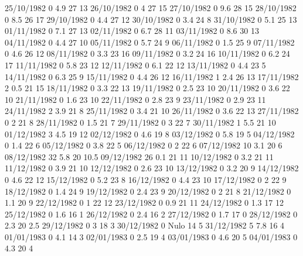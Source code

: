 25/10/1982  0      4.9    27     13 
26/10/1982  0      4      27     15 
27/10/1982  0      9.6    28     15 
28/10/1982  0      8.5    26     17 
29/10/1982  0      4.4    27     12 
30/10/1982  0      3.4    24     8 
31/10/1982  0      5.1    25     13 
01/11/1982  0      7.1    27     13 
02/11/1982  0      6.7    28     11 
03/11/1982  0      8.6    30     13 
04/11/1982  0      4.4    27     10 
05/11/1982  0      5.7    24     9 
06/11/1982  0      1.5    25     9 
07/11/1982  0      4.6    26     12 
08/11/1982  0      3.3    23     16 
09/11/1982  0      3.2    24     16 
10/11/1982  0      6.2    24     17 
11/11/1982  0      5.8    23     12 
12/11/1982  0      6.1    22     12 
13/11/1982  0      4.4    23     5 
14/11/1982  0      6.3    25     9 
15/11/1982  0      4.4    26     12 
16/11/1982  1      2.4    26     13 
17/11/1982  2      0.5    21     15 
18/11/1982  0      3.3    22     13 
19/11/1982  0      2.5    23     10 
20/11/1982  0      3.6    22     10 
21/11/1982  0      1.6    23     10 
22/11/1982  0      2.8    23     9 
23/11/1982  0      2.9    23     11 
24/11/1982  2      3.9    21     8 
25/11/1982  0      3.4    21     10 
26/11/1982  0      3.6    22     13 
27/11/1982  0      2      21     8 
28/11/1982  0      1.5    21     7 
29/11/1982  0      3      22     7 
30/11/1982  1      5.5    21     10 
01/12/1982  3      4.5    19     12 
02/12/1982  0      4.6    19     8 
03/12/1982  0      5.8    19     5 
04/12/1982  0      1.4    22     6 
05/12/1982  0      3.8    22     5 
06/12/1982  0      2      22     6 
07/12/1982  10     3.1    20     6 
08/12/1982  32     5.8    20     10.5 
09/12/1982  26     0.1    21     11 
10/12/1982  0      3.2    21     11 
11/12/1982  0      3.9    21     10 
12/12/1982  0      2.6    23     10 
13/12/1982  0      3.2    20     9 
14/12/1982  0      4.6    22     12 
15/12/1982  0      5.2    23     8 
16/12/1982  0      4.4    23     10 
17/12/1982  0      2      22     9 
18/12/1982  0      1.4    24     9 
19/12/1982  0      2.4    23     9 
20/12/1982  0      2      21     8 
21/12/1982  0      1.1    20     9 
22/12/1982  0      1      22     12 
23/12/1982  0      0.9    21     11 
24/12/1982  0      1.3    17     12 
25/12/1982  0      1.6    16     1 
26/12/1982  0      2.4    16     2 
27/12/1982  0      1.7    17     0 
28/12/1982  0      2.3    20     2.5 
29/12/1982  0      3      18     3 
30/12/1982  0     Nulo    14     5 
31/12/1982  5      7.8    16     4 
01/01/1983  0      4.1    14     3 
02/01/1983  0      2.5    19     4 
03/01/1983  0      4.6    20     5 
04/01/1983  0      4.3    20     4 
